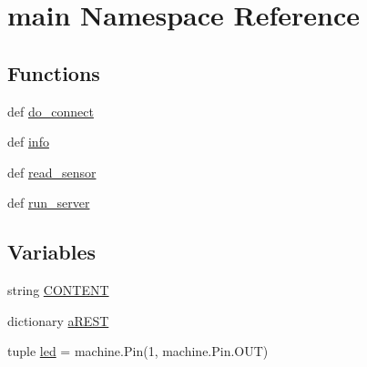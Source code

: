 \hypertarget{namespacemain}{\section{main Namespace Reference}
\label{namespacemain}
}
\subsection*{Functions}
\begin{DoxyCompactItemize}
\item 
def \hyperlink{namespacemain_a2e6e30c9b148bab9fb79fb3799f018a7}{do\-\_\-connect}
\item 
def \hyperlink{namespacemain_a651355e6cdbb5a16e79b1a17942f37e1}{info}
\item 
def \hyperlink{namespacemain_a2307350d5662c2f9f8b6d9a4ba0493ac}{read\-\_\-sensor}
\item 
def \hyperlink{namespacemain_aa2fc3cdf22f88432652df4fd6de69302}{run\-\_\-server}
\end{DoxyCompactItemize}
\subsection*{Variables}
\begin{DoxyCompactItemize}
\item 
string \hyperlink{namespacemain_a9f1b66682ed213ee4114be73ecccc969}{C\-O\-N\-T\-E\-N\-T}
\item 
dictionary \hyperlink{namespacemain_ae45e77e713b3c943659056426e077b4c}{a\-R\-E\-S\-T}
\item 
tuple \hyperlink{namespacemain_afa42c8222ef34c64505913e2c20ca278}{led} = machine.\-Pin(1, machine.\-Pin.\-O\-U\-T)
\end{DoxyCompactItemize}


